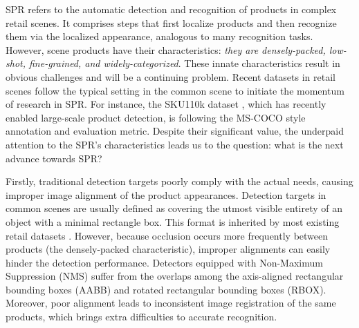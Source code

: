 \documentclass[runningheads]{llncs}
\begin{document}
SPR refers to the automatic detection and recognition of products in complex retail scenes. It comprises steps that first localize products and then recognize them via the localized appearance, analogous to many recognition tasks. However, scene products have their characteristics: \textit{they are densely-packed, low-shot, fine-grained, and widely-categorized}. These innate characteristics result in obvious challenges and will be a continuing problem. Recent datasets in retail scenes follow the typical setting in the common scene to initiate the momentum of research in SPR. For instance, the SKU110k dataset \cite{SKU110k}, which has recently enabled large-scale product detection, is following the MS-COCO \cite{lin2014microsoft} style annotation and evaluation metric. Despite their significant value, the underpaid attention to the SPR's characteristics leads us to the question: %
what is the next advance towards SPR?

Firstly, traditional detection targets poorly comply with the actual needs, causing improper image alignment of the product appearances. Detection targets in common scenes \cite{lin2014microsoft,yang2016wider,voc_dataset,DOTA2021} are usually defined as covering the utmost visible entirety of an object with a minimal rectangle box. This format is inherited by most existing retail datasets \cite{SKU110k,rpc,Grozi-3.2k,Grocery_shelves,locount}. However, because occlusion occurs more frequently between products (the densely-packed characteristic), improper alignments can easily hinder the detection performance. Detectors equipped with Non-Maximum Suppression (NMS) suffer from the overlaps among the axis-aligned rectangular bounding boxes (AABB) and rotated rectangular bounding boxes (RBOX). Moreover, poor alignment leads to inconsistent image registration of the same products, which brings extra difficulties to accurate recognition.   
\end{document}
